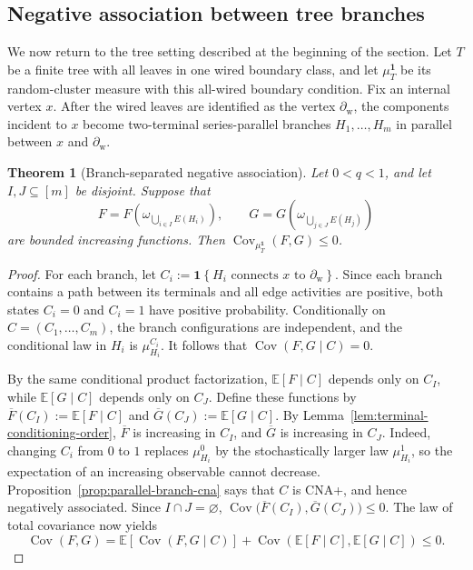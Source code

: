 \documentclass[11pt]{amsart}
\theoremstyle{plain}
\newtheorem{theorem}{Theorem}[section]
\theoremstyle{definition}
\theoremstyle{remark}
\begin{document}
\subsection{Negative association between tree branches}

We now return to the tree setting described at the beginning of the section. Let $T$ be a finite tree with all leaves in one wired boundary class, and let $\mu_T^{\mathbf 1}$ be its random-cluster measure with this all-wired boundary condition. Fix an internal vertex $x$. After the wired leaves are identified as the vertex $\partial_{\mathrm w}$, the components incident to $x$ become two-terminal series-parallel branches $H_1,\ldots,H_m$ in parallel between $x$ and $\partial_{\mathrm w}$.

\begin{theorem}[Branch-separated negative association]
\label{thm:branch-separated-na}
Let $0<q<1$, and let $I,J\subseteq[m]$ be disjoint. Suppose that
\[
    F
    =
    F\left(
        \omega_{\bigcup_{i\in I}E(H_i)}
    \right),
    \qquad
    G
    =
    G\left(
        \omega_{\bigcup_{j\in J}E(H_j)}
    \right)
\]
are bounded increasing functions. Then $\operatorname{Cov}_{\mu_T^{\mathbf 1}}(F,G)\le0$.
\end{theorem}

\begin{proof}
For each branch, let $C_i:=\mathbf 1\left\{H_i\text{ connects }x\text{ to }\partial_{\mathrm w}\right\}$. Since each branch contains a path between its terminals and all edge activities are positive, both states $C_i=0$ and $C_i=1$ have positive probability. Conditionally on $C=(C_1,\ldots,C_m)$, the branch configurations are independent, and the conditional law in $H_i$ is $\mu_{H_i}^{C_i}$. It follows that $\operatorname{Cov}(F,G\mid C)=0$.

By the same conditional product factorization, $\mathbb E[F\mid C]$ depends only on $C_I$, while $\mathbb E[G\mid C]$ depends only on $C_J$. Define these functions by $\overline F(C_I):=\mathbb E[F\mid C]$ and $\overline G(C_J):=\mathbb E[G\mid C]$. By Lemma~\ref{lem:terminal-conditioning-order}, $\overline F$ is increasing in $C_I$, and $\overline G$ is increasing in $C_J$. Indeed, changing $C_i$ from $0$ to $1$ replaces $\mu_{H_i}^0$ by the stochastically larger law $\mu_{H_i}^1$, so the expectation of an increasing observable cannot decrease. Proposition~\ref{prop:parallel-branch-cna} says that $C$ is CNA+, and hence negatively associated. Since $I\cap J=\varnothing$, $\operatorname{Cov}\bigl(\overline F(C_I),\overline G(C_J)\bigr)\le0$.
The law of total covariance now yields
\[
    \operatorname{Cov}(F,G)
    =
    \mathbb E
    \left[
        \operatorname{Cov}(F,G\mid C)
    \right]
    +
    \operatorname{Cov}
    \left(
        \mathbb E[F\mid C],
        \mathbb E[G\mid C]
    \right)
    \le0.
\]
\end{proof}
\end{document}
